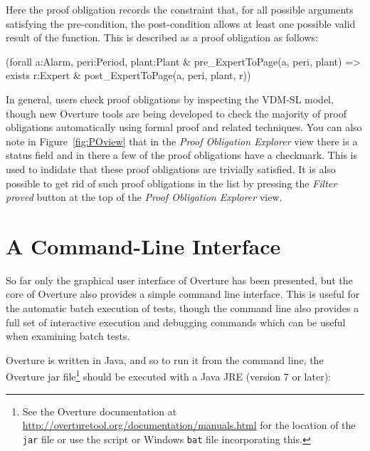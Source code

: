 
Here the proof obligation records the constraint that, for all possible arguments satisfying the pre-condition, the post-condition allows at least one possible valid result of the function. This is described as a proof obligation as follows: 

\begin{vdmsl}
(forall a:Alarm, peri:Period, plant:Plant &
    pre_ExpertToPage(a, peri, plant) => 
    exists r:Expert & post_ExpertToPage(a, peri, plant, r))
\end{vdmsl}

In general, users check proof obligations by inspecting the VDM-SL model, though new Overture tools are being developed to check the majority of proof obligations automatically using formal proof and related
techniques. You can also note in Figure~\ref{fig:POview} that in the \emph{Proof Obligation Explorer} view there is a status field and in there a few of the proof obligations have a checkmark. This is used to indidate that these proof obligations are trivially satisfied. It is also possible to get rid of such proof obligations in the list by pressing the \emph{Filter proved} button at the top of the \emph{Proof Obligation Explorer} view.
%
\section{A Command-Line Interface}\label{sec:cmdline}
So far only the graphical user interface of Overture has been presented, but the core of Overture also
provides a simple command line interface.  This is useful for the automatic batch execution of tests, though the command line also provides a full set of interactive execution and debugging commands which can be useful when examining batch tests. 

Overture is written in Java, and so to run it from the command line, the Overture jar file\footnote{See the Overture documentation at \url{http://overturetool.org/documentation/manuals.html} for the location of the \texttt{jar} file or use the script or Windows \texttt{bat} file incorporating this.} should be executed with a Java JRE (version 7 or later):

